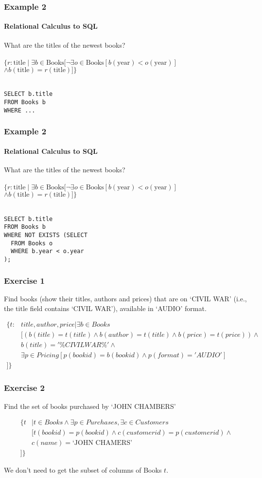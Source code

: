 \documentclass{beamer}
\begin{document}
\begin{frame}[fragile]
  \frametitle{Example 2}
    \framesubtitle{Relational Calculus to SQL}
  What are the titles of the newest books?\\
  \hfill \\
  $\{r:\text{title} \mid \exists b \in \text{Books} [ \neg\exists o \in \text{Books} [ b(\text{year}) < o(\text{year})]$\\
  $\land b(\text{title}) = r(\text{title})] \}$\\
  \hfill \\
\begin{lstlisting}
SELECT b.title
FROM Books b
WHERE ...
\end{lstlisting}
\end{frame}

\begin{frame}[fragile]
  \frametitle{Example 2}
    \framesubtitle{Relational Calculus to SQL}
  What are the titles of the newest books?\\
  \hfill \\
  $\{r:\text{title} \mid \exists b \in \text{Books} [ \neg\exists o \in \text{Books} [ b(\text{year}) < o(\text{year})]$\\
  $\land b(\text{title}) = r(\text{title})] \}$\\
  \hfill \\
\begin{lstlisting}
SELECT b.title
FROM Books b
WHERE NOT EXISTS (SELECT 
  FROM Books o
  WHERE b.year < o.year
);
\end{lstlisting}
\end{frame}


\begin{frame}[fragile]
  \frametitle{Exercise 1}
  Find books (show their titles, authors and prices) that are on `CIVIL WAR' (i.e., the title field contains `CIVIL WAR'), available in `AUDIO' format. 

\begin{align*}
\{t: &title, author, price| \exists b \in Books \\
&[(b(title)=t(title)\wedge b(author)=t(title) \wedge b(price)=t(price)) \wedge \\
& b(title)='\%CIVIL WAR\%' \wedge \\
& \exists p \in Pricing [p(bookid)=b(bookid) \wedge p(format)='AUDIO']\\
]\}
\end{align*}
\end{frame}

\begin{frame}[fragile]
\frametitle{Exercise 2}
Find the set of books purchased by  `JOHN CHAMBERS'

\begin{align*}
\{t&|t\in Books\wedge \exists p \in Purchases, \exists c \in Customers \\
&[t(bookid)=p(bookid) \wedge c(customerid)=p(customerid) \wedge \\
&c(name)=\text{`JOHN CHAMERS'}\\
]\}
\end{align*}

We don't need to get the subset of columns of Books $t$. 
\end{frame}
\end{document}
